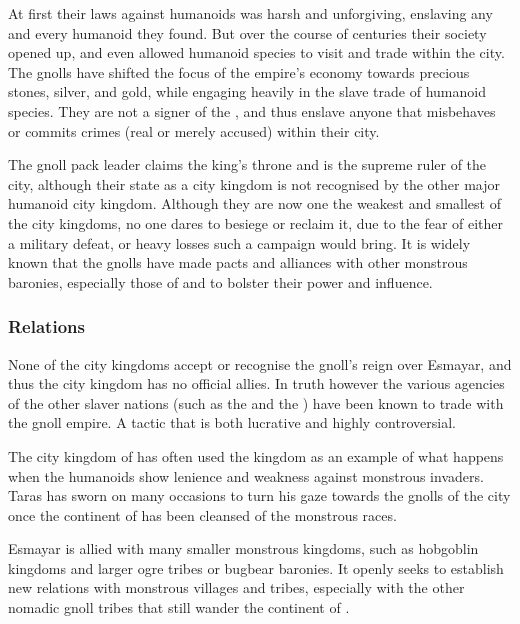 At first their laws against humanoids was harsh and unforgiving, enslaving any
and every humanoid they found. But over the course of centuries their society
opened up, and even allowed humanoid species to visit and trade within the
city. The gnolls have shifted the focus of the empire's economy towards
precious stones, silver, and gold, while engaging heavily in the slave trade
of humanoid species. They are not a signer of the ,
and thus enslave anyone that misbehaves or commits crimes (real or merely
accused) within their city.

The gnoll pack leader claims the king's throne and is the supreme ruler of the
city, although their state as a city kingdom is not recognised by the other
major humanoid city kingdom. Although they are now one the weakest and
smallest of the city kingdoms, no one dares to besiege or reclaim it, due to
the fear of either a military defeat, or heavy losses such a campaign would
bring. It is widely known that the gnolls have made pacts and alliances with
other monstrous baronies, especially those of  and
 to bolster their power and influence.

\subsubsection{Relations}


None of the city kingdoms accept or recognise the gnoll's reign over Esmayar,
and thus the city kingdom has no official allies. In truth however the various
agencies of the other slaver nations (such as the 
and the ) have been known to trade with the gnoll
empire. A tactic that is both lucrative and highly controversial.

The city kingdom of  has often used the kingdom as an
example of what happens when the humanoids show lenience and weakness against
monstrous invaders. Taras has sworn on many occasions to turn his gaze towards
the gnolls of the city once the continent of  has been
cleansed of the monstrous races.

Esmayar is allied with many smaller monstrous kingdoms, such as hobgoblin
kingdoms and larger ogre tribes or bugbear baronies. It openly seeks to
establish new relations with monstrous villages and tribes, especially with
the other nomadic gnoll tribes that still wander the continent of
.
